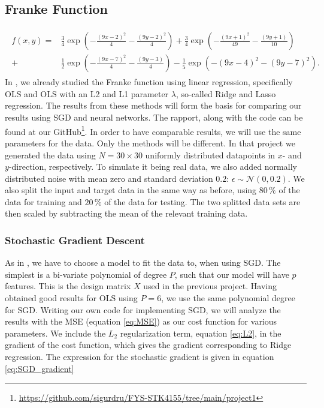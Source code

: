 \documentclass[12pt]{extarticle}
\begin{document}
\subsection{Franke Function}
\begin{align}
	\begin{split}\label{eq:FF}
		f(x,y) = &\frac{3}{4}\exp(-\frac{(9x -2)^2}{4} - \frac{(9y-2)^2}{4}) + \frac{3}{4}\exp(-\frac{(9x + 1)^2}{49} - \frac{(9y + 1)}{10})
		\\
		+ &\frac{1}{2}\exp(-\frac{(9x-7)^2}{4} - \frac{(9y -3)}{4}) - \frac{1}{5}\exp(-(9x-4)^2 - (9y-7)^2).
	\end{split}
\end{align}
In \cite{project1}, we already studied the Franke function using linear regression, specifically OLS and OLS with an L2 and L1 parameter $\lambda$, so-called Ridge and Lasso regression. The results from these methods will form the basis for comparing our results using SGD and neural networks. The rapport, along with the code can be found at our GitHub\footnote{\href{https://github.com/sigurdru/FYS-STK4155/tree/main/project1}{https://github.com/sigurdru/FYS-STK4155/tree/main/project1}}. In order to have comparable results, we will use the same parameters for the data. Only the methods will be different. In that project we generated the data using $N=30\times30$ uniformly distributed datapoints in $x$- and $y$-direction, respectively. To simulate it being real data, we also added normally distributed noise with mean zero and standard deviation $0.2$: $\epsilon \sim \mathcal{N}(0,0.2)$. We also split the input and target data in the same way as before, using $80\,\%$ of the data for training and $20\,\%$ of the data for testing. The two splitted data sets are then scaled by subtracting the mean of the relevant training data.

\subsubsection{Stochastic Gradient Descent}
As in \cite{project1}, we have to choose a model to fit the data to, when using SGD. The simplest is a bi-variate polynomial of degree $P$, such that our model will have $p$ features. This is the design matrix $X$ used in the previous project. Having obtained good results for OLS using $P = 6$, we use the same polynomial degree for SGD. Writing our own code for implementing SGD, we will analyze the results with the MSE (equation \eqref{eq:MSE}) as our cost function for various parameters. We include the $L_2$ regularization term, equation \eqref{eq:L2}, in the gradient of the cost function, which gives the gradient corresponding to Ridge regression. The expression for the stochastic gradient is given in equation \eqref{eq:SGD_gradient}
\end{document}
